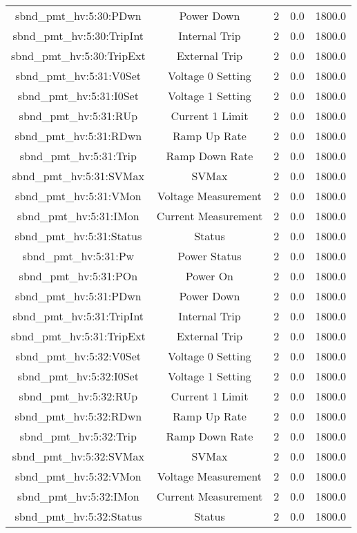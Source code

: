 \begin{center}
\begin{longtable}{c | c c c c }
sbnd\_pmt\_hv:5:30:PDwn & Power Down & 2 & 0.0 & 1800.0\\ 
sbnd\_pmt\_hv:5:30:TripInt & Internal Trip & 2 & 0.0 & 1800.0\\ 
sbnd\_pmt\_hv:5:30:TripExt & External Trip & 2 & 0.0 & 1800.0\\ 
sbnd\_pmt\_hv:5:31:V0Set & Voltage 0 Setting & 2 & 0.0 & 1800.0\\ 
sbnd\_pmt\_hv:5:31:I0Set & Voltage 1 Setting & 2 & 0.0 & 1800.0\\ 
sbnd\_pmt\_hv:5:31:RUp & Current 1 Limit & 2 & 0.0 & 1800.0\\ 
sbnd\_pmt\_hv:5:31:RDwn & Ramp Up Rate & 2 & 0.0 & 1800.0\\ 
sbnd\_pmt\_hv:5:31:Trip & Ramp Down Rate & 2 & 0.0 & 1800.0\\ 
sbnd\_pmt\_hv:5:31:SVMax & SVMax & 2 & 0.0 & 1800.0\\ 
sbnd\_pmt\_hv:5:31:VMon & Voltage Measurement & 2 & 0.0 & 1800.0\\ 
sbnd\_pmt\_hv:5:31:IMon & Current Measurement & 2 & 0.0 & 1800.0\\ 
sbnd\_pmt\_hv:5:31:Status & Status & 2 & 0.0 & 1800.0\\ 
sbnd\_pmt\_hv:5:31:Pw & Power Status & 2 & 0.0 & 1800.0\\ 
sbnd\_pmt\_hv:5:31:POn & Power On & 2 & 0.0 & 1800.0\\ 
sbnd\_pmt\_hv:5:31:PDwn & Power Down & 2 & 0.0 & 1800.0\\ 
sbnd\_pmt\_hv:5:31:TripInt & Internal Trip & 2 & 0.0 & 1800.0\\ 
sbnd\_pmt\_hv:5:31:TripExt & External Trip & 2 & 0.0 & 1800.0\\ 
sbnd\_pmt\_hv:5:32:V0Set & Voltage 0 Setting & 2 & 0.0 & 1800.0\\ 
sbnd\_pmt\_hv:5:32:I0Set & Voltage 1 Setting & 2 & 0.0 & 1800.0\\ 
sbnd\_pmt\_hv:5:32:RUp & Current 1 Limit & 2 & 0.0 & 1800.0\\ 
sbnd\_pmt\_hv:5:32:RDwn & Ramp Up Rate & 2 & 0.0 & 1800.0\\ 
sbnd\_pmt\_hv:5:32:Trip & Ramp Down Rate & 2 & 0.0 & 1800.0\\ 
sbnd\_pmt\_hv:5:32:SVMax & SVMax & 2 & 0.0 & 1800.0\\ 
sbnd\_pmt\_hv:5:32:VMon & Voltage Measurement & 2 & 0.0 & 1800.0\\ 
sbnd\_pmt\_hv:5:32:IMon & Current Measurement & 2 & 0.0 & 1800.0\\ 
sbnd\_pmt\_hv:5:32:Status & Status & 2 & 0.0 & 1800.0\\ 

\end{longtable}
\end{center}
